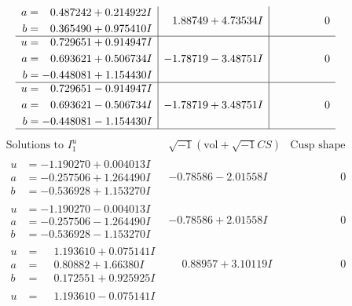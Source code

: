 \documentclass[1p]{elsarticle_modified}
\theoremstyle{definition}
\newcommand{\I}{\sqrt{-1}}
\begin{document}
$$\begin{array}{c|c|c}
\begin{aligned}
a &= \phantom{-}0.487242 + 0.214922 I \\
b &= \phantom{-}0.365490 + 0.975410 I\end{aligned}
 & \phantom{-}1.88749 + 4.73534 I & \phantom{-0.000000 } 0 \\ \hline\begin{aligned}
u &= \phantom{-}0.729651 + 0.914947 I \\
a &= \phantom{-}0.693621 + 0.506734 I \\
b &= -0.448081 + 1.154430 I\end{aligned}
 & -1.78719 - 3.48751 I & \phantom{-0.000000 } 0 \\ \hline\begin{aligned}
u &= \phantom{-}0.729651 - 0.914947 I \\
a &= \phantom{-}0.693621 - 0.506734 I \\
b &= -0.448081 - 1.154430 I\end{aligned}
 & -1.78719 + 3.48751 I & \phantom{-0.000000 } 0\\
 \hline 
 \end{array}$$\newpage$$\begin{array}{c|c|c}  
\text{Solutions to }I^u_{1}& \I (\text{vol} + \sqrt{-1}CS) & \text{Cusp shape}\\
 \hline 
\begin{aligned}
u &= -1.190270 + 0.004013 I \\
a &= -0.257506 + 1.264490 I \\
b &= -0.536928 + 1.153270 I\end{aligned}
 & -0.78586 - 2.01558 I & \phantom{-0.000000 } 0 \\ \hline\begin{aligned}
u &= -1.190270 - 0.004013 I \\
a &= -0.257506 - 1.264490 I \\
b &= -0.536928 - 1.153270 I\end{aligned}
 & -0.78586 + 2.01558 I & \phantom{-0.000000 } 0 \\ \hline\begin{aligned}
u &= \phantom{-}1.193610 + 0.075141 I \\
a &= \phantom{-}0.80882 + 1.66380 I \\
b &= \phantom{-}0.172551 + 0.925925 I\end{aligned}
 & \phantom{-}0.88957 + 3.10119 I & \phantom{-0.000000 } 0 \\ \hline\begin{aligned}
u &= \phantom{-}1.193610 - 0.075141 I \\

\end{aligned}
\end{array}$$
\end{document}
